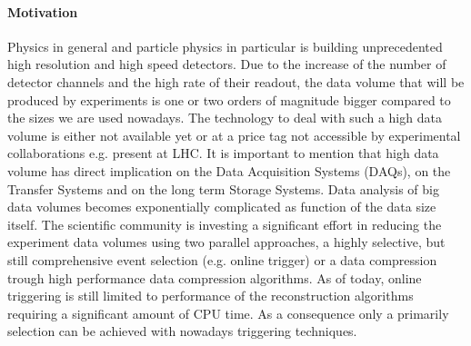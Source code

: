 \paragraph{Motivation}

Physics in general and particle physics in particular is building unprecedented high resolution and high speed detectors. Due to the increase of the number of detector channels and the high rate of their readout, the data volume that will be produced by experiments is one or two orders of magnitude bigger compared to the sizes we are used nowadays. The technology to deal with such a high data volume is either not available yet or at a price tag not accessible by experimental collaborations e.g. present at LHC. It is important to mention that high data volume has direct implication on the Data Acquisition Systems (DAQs), on the Transfer Systems and on the long term Storage Systems. Data analysis of big data volumes becomes exponentially complicated as function of the data size itself. The scientific community is investing a significant effort in reducing the experiment data volumes using two parallel approaches, a highly selective, but still comprehensive event selection (e.g. online trigger) or a data compression trough high performance data compression algorithms. 
As of today, online triggering is still limited to performance of the reconstruction algorithms requiring a significant amount of CPU time. As a consequence only a primarily selection can be achieved with nowadays triggering techniques. 

